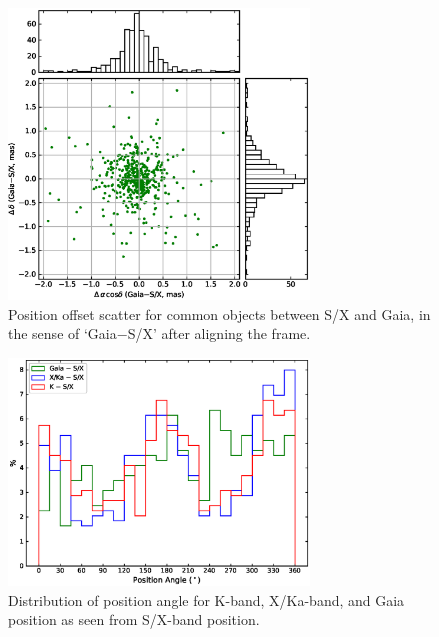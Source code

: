 \documentclass{aa}   %
\begin{document}
\begin{figure}[hbtp]
    \centering
    \includegraphics[width=80mm]{figs/gdr2-sx-scatter-nosys}
    \caption[]{\label{fig:gdr2-sx-scatter-nosyst}
        Position offset scatter for common objects between S/X and Gaia, in the sense of `Gaia$-$S/X' after aligning the frame.
    }
\end{figure}

\begin{figure}[hbtp]
    \centering
    \includegraphics[width=80mm]{figs/pa-nosys}
    \caption[]{\label{fig:pa-nosys}
        Distribution of position angle for K-band, X/Ka-band, and Gaia position as seen from S/X-band position. 
    }
\end{figure}
\end{document}
